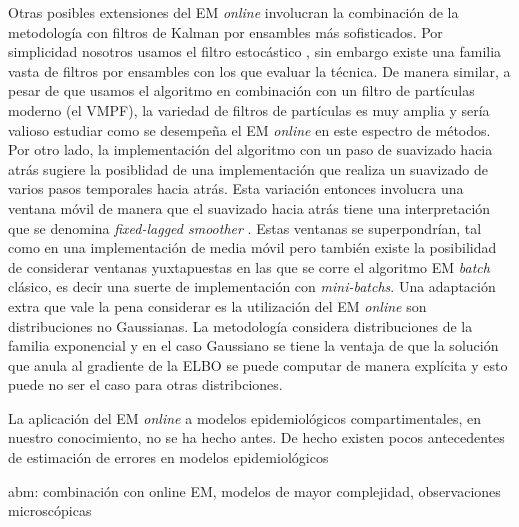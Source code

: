 Otras posibles extensiones del EM \textit{online} involucran la combinación de la metodología con filtros de Kalman por ensambles más sofisticados. Por simplicidad nosotros usamos el filtro estocástico \citep{Burgers1998}, sin embargo existe una familia vasta de filtros por ensambles con los que evaluar la técnica. De manera similar, a pesar de que usamos el algoritmo en combinación con un filtro de partículas moderno (el VMPF), la variedad de filtros de partículas es muy amplia y sería valioso estudiar como se desempeña el EM \textit{online} en este espectro de métodos. Por otro lado, la implementación del algoritmo con un paso de suavizado hacia atrás sugiere la posiblidad de una implementación que realiza un suavizado de varios pasos temporales hacia atrás. Esta variación entonces involucra una ventana móvil de manera que el suavizado hacia atrás tiene una interpretación que se denomina \textit{fixed-lagged smoother} \citep{Cosme2012}. Estas ventanas se superpondrían, tal como en una implementación de media móvil pero también existe la posibilidad de considerar ventanas yuxtapuestas en las que se corre el algoritmo EM \textit{batch} clásico, es decir una suerte de implementación con \textit{mini-batchs}. Una adaptación extra que vale la pena considerar es la utilización del EM \textit{online} son distribuciones no Gaussianas. La metodología considera distribuciones de la familia exponencial y en el caso Gaussiano se tiene la ventaja de que la solución que anula al gradiente de la ELBO se puede computar de manera explícita y esto puede no ser el caso para otras distribciones.

La aplicación del EM \textit{online} a modelos epidemiológicos compartimentales, en nuestro conocimiento, no se ha hecho antes. De hecho existen pocos antecedentes de estimación de errores en modelos epidemiológicos

abm: combinación con online EM, modelos de mayor complejidad, observaciones microscópicas
